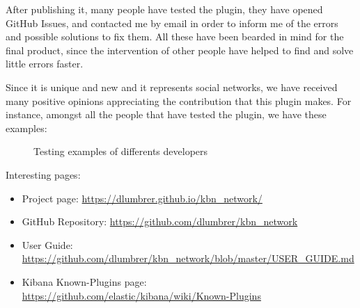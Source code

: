 \documentclass[a4paper, 12pt]{book}
\begin{document}
After publishing it, many people have tested the plugin, they have opened GitHub Issues, and contacted me by email in order to inform me of the errors and possible solutions to fix them. All these have been bearded in mind for the final product, since the intervention of other people have helped to find and solve little errors faster.

Since it is unique and new and it represents social networks, we have received many positive opinions appreciating the contribution that this plugin makes. For instance, amongst all the people that have tested the plugin, we have these examples:

\begin{figure}[H]
 \centering
 \caption{Testing examples of differents developers}
 \label{f:testdevelopers}
\end{figure}

Interesting pages:

\begin{itemize}
\item Project page: \url{https://dlumbrer.github.io/kbn_network/}
\item GitHub Repository: \url{https://github.com/dlumbrer/kbn_network}
\item User Guide: \url{https://github.com/dlumbrer/kbn_network/blob/master/USER_GUIDE.md}
\item Kibana Known-Plugins page: \url{https://github.com/elastic/kibana/wiki/Known-Plugins}
\end{itemize}
\end{document}
